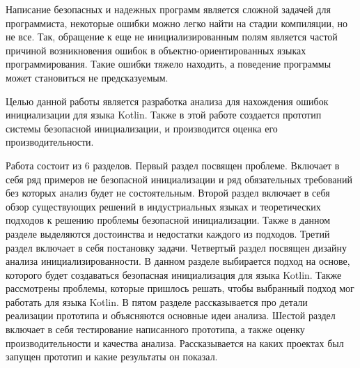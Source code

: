 \intro

Написание безопасных и надежных программ является сложной задачей для программиста,
некоторые ошибки можно легко найти на стадии компиляции, но не все.
Так, обращение к еще не инициализированным полям является частой причиной возникновения ошибок
в объектно-ориентированных языках программирования.
Такие ошибки тяжело находить, а поведение программы может становиться не предсказуемым.

Целью данной работы является разработка анализа для нахождения ошибок инициализации для языка Kotlin.
Также в этой работе создается прототип системы безопасной инициализации, и производится оценка его производительности.

Работа состоит из 6 разделов.
Первый раздел посвящен проблеме.
Включает в себя ряд примеров не безопасной инициализации и ряд обязательных требований без которых анализ будет не состоятельным.
Второй раздел включает в себя обзор существующих решений в индустриальных языках и теоретических подходов
к решению проблемы безопасной инициализации.
Также в данном разделе выделяются достоинства и недостатки каждого из подходов.
Третий раздел включает в себя постановку задачи.
Четвертый раздел посвящен дизайну анализа инициализированности.
В данном разделе выбирается подход на основе, которого будет создаваться безопасная инициализация для языка Kotlin.
Также рассмотрены проблемы, которые пришлось решать, чтобы выбранный подход мог работать для языка Kotlin.
В пятом разделе рассказывается про детали реализации прототипа и объясняются основные идеи анализа.
Шестой раздел включает в себя тестирование написанного прототипа, а также оценку производительности и качества анализа.
Рассказывается на каких проектах был запущен прототип и какие результаты он показал.
